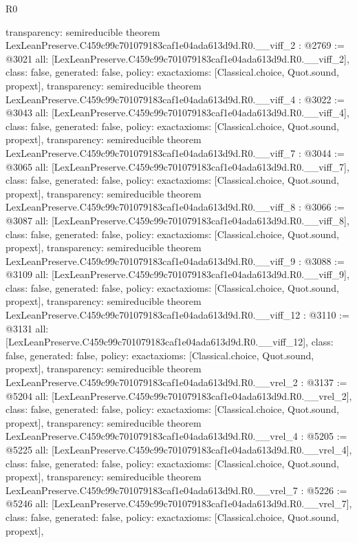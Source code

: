 \begin{lexlean}{R0}
\begin{coremodule}
{  transparency: semireducible
}
theorem LexLeanPreserve.C459c99c701079183caf1e04ada613d9d.R0.__viff_2 : @2769 := @3021 {
  all: [LexLeanPreserve.C459c99c701079183caf1e04ada613d9d.R0.__viff_2],
  class: false,
  generated: false,
  policy: exact{axioms: [Classical.choice, Quot.sound, propext]},
  transparency: semireducible
}
theorem LexLeanPreserve.C459c99c701079183caf1e04ada613d9d.R0.__viff_4 : @3022 := @3043 {
  all: [LexLeanPreserve.C459c99c701079183caf1e04ada613d9d.R0.__viff_4],
  class: false,
  generated: false,
  policy: exact{axioms: [Classical.choice, Quot.sound, propext]},
  transparency: semireducible
}
theorem LexLeanPreserve.C459c99c701079183caf1e04ada613d9d.R0.__viff_7 : @3044 := @3065 {
  all: [LexLeanPreserve.C459c99c701079183caf1e04ada613d9d.R0.__viff_7],
  class: false,
  generated: false,
  policy: exact{axioms: [Classical.choice, Quot.sound, propext]},
  transparency: semireducible
}
theorem LexLeanPreserve.C459c99c701079183caf1e04ada613d9d.R0.__viff_8 : @3066 := @3087 {
  all: [LexLeanPreserve.C459c99c701079183caf1e04ada613d9d.R0.__viff_8],
  class: false,
  generated: false,
  policy: exact{axioms: [Classical.choice, Quot.sound, propext]},
  transparency: semireducible
}
theorem LexLeanPreserve.C459c99c701079183caf1e04ada613d9d.R0.__viff_9 : @3088 := @3109 {
  all: [LexLeanPreserve.C459c99c701079183caf1e04ada613d9d.R0.__viff_9],
  class: false,
  generated: false,
  policy: exact{axioms: [Classical.choice, Quot.sound, propext]},
  transparency: semireducible
}
theorem LexLeanPreserve.C459c99c701079183caf1e04ada613d9d.R0.__viff_12 : @3110 := @3131 {
  all: [LexLeanPreserve.C459c99c701079183caf1e04ada613d9d.R0.__viff_12],
  class: false,
  generated: false,
  policy: exact{axioms: [Classical.choice, Quot.sound, propext]},
  transparency: semireducible
}
theorem LexLeanPreserve.C459c99c701079183caf1e04ada613d9d.R0.__vrel_2 : @3137 := @5204 {
  all: [LexLeanPreserve.C459c99c701079183caf1e04ada613d9d.R0.__vrel_2],
  class: false,
  generated: false,
  policy: exact{axioms: [Classical.choice, Quot.sound, propext]},
  transparency: semireducible
}
theorem LexLeanPreserve.C459c99c701079183caf1e04ada613d9d.R0.__vrel_4 : @5205 := @5225 {
  all: [LexLeanPreserve.C459c99c701079183caf1e04ada613d9d.R0.__vrel_4],
  class: false,
  generated: false,
  policy: exact{axioms: [Classical.choice, Quot.sound, propext]},
  transparency: semireducible
}
theorem LexLeanPreserve.C459c99c701079183caf1e04ada613d9d.R0.__vrel_7 : @5226 := @5246 {
  all: [LexLeanPreserve.C459c99c701079183caf1e04ada613d9d.R0.__vrel_7],
  class: false,
  generated: false,
  policy: exact{axioms: [Classical.choice, Quot.sound, propext]},
}
\end{coremodule}
\end{lexlean}
